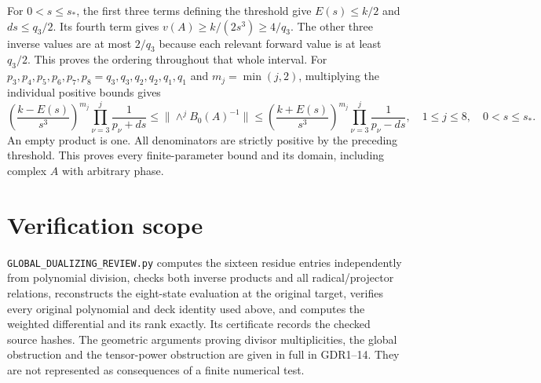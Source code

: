 \documentclass[10pt]{article}
\begin{document}
For $0<s\le s_*$, the first three terms defining the threshold
give $E(s)\le k/2$ and $ds\le q_3/2$. Its fourth term gives
$v(A)\ge k/(2s^3)\ge4/q_3$. The other three inverse values
are at most $2/q_3$ because each relevant forward value is
at least $q_3/2$. This proves the ordering throughout that
whole interval. For $p_3,p_4,p_5,p_6,p_7,p_8=
q_3,q_3,q_2,q_2,q_1,q_1$ and $m_j=\min(j,2)$, multiplying
the individual positive bounds gives
\begin{equation}
 \left(\frac{k-E(s)}{s^3}\right)^{m_j}
 \prod_{\nu=3}^{j}\frac1{p_\nu+ds}
 \le\|\wedge^j B_0(A)^{-1}\|
 \le\left(\frac{k+E(s)}{s^3}\right)^{m_j}
 \prod_{\nu=3}^{j}\frac1{p_\nu-ds},
 \quad 1\le j\le8,\quad 0<s\le s_*.
 \tag{GDR30}
\end{equation}
An empty product is one. All denominators are strictly
positive by the preceding threshold. This proves every
finite-parameter bound and its domain, including complex
$A$ with arbitrary phase.

\section{Verification scope}
\texttt{GLOBAL\_DUALIZING\_REVIEW.py} computes the sixteen
residue entries independently from polynomial division,
checks both inverse products and all radical/projector
relations, reconstructs the eight-state evaluation at the
original target, verifies every original polynomial and deck
identity used above, and computes the weighted differential
and its rank exactly. Its certificate records the checked
source hashes. The geometric arguments proving divisor
multiplicities, the global obstruction and the tensor-power
obstruction are given in full in GDR1--14. They are not
represented as consequences of a finite numerical test.
\end{document}
